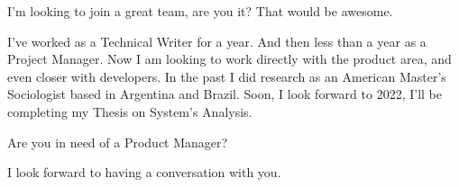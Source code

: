 I’m looking to join a great team, are you it? That would be awesome.

I’ve worked as a Technical Writer for a year. 
And then less than a year as a Project Manager.
Now I am looking to work directly
with the product area, and even closer with developers. 
In the past I did research as an American
Master's Sociologist based in Argentina and Brazil. 
Soon, I look forward to 2022, I’ll be completing my Thesis on System's Analysis.

Are you in need of a Product Manager? 


I look forward to having a conversation with you.


% 
% 
% 

